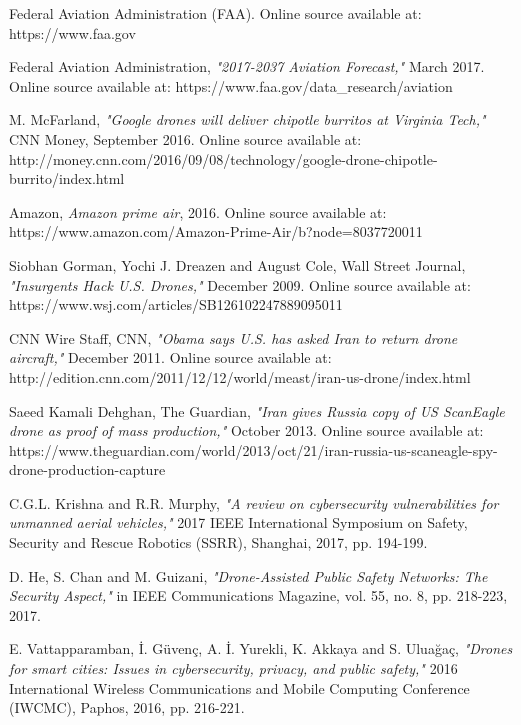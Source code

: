 \documentclass[journal]{IEEEtran}
\begin{document}
\begin{thebibliography}{1}

Federal Aviation Administration (FAA). Online source available at: https://www.faa.gov

Federal Aviation Administration, \textit{"2017-2037 Aviation Forecast,"} March 2017. Online source available at: https://www.faa.gov/data\_research/aviation

M. McFarland, \textit{"Google drones will deliver chipotle burritos at Virginia Tech,"} CNN Money, September 2016. Online source available at: http://money.cnn.com/2016/09/08/technology/google-drone-chipotle-burrito/index.html

Amazon, \textit{Amazon prime air}, 2016. Online source available at: https://www.amazon.com/Amazon-Prime-Air/b?node=8037720011

Siobhan Gorman,  Yochi J. Dreazen and August Cole, Wall Street Journal, \textit{"Insurgents Hack U.S. Drones,"} December 2009. Online source available at: https://www.wsj.com/articles/SB126102247889095011

CNN Wire Staff, CNN, \textit{"Obama says U.S. has asked Iran to return drone aircraft,"} December 2011. Online source available at: http://edition.cnn.com/2011/12/12/world/meast/iran-us-drone/index.html

Saeed Kamali Dehghan, The Guardian, \textit{"Iran gives Russia copy of US ScanEagle drone as proof of mass production,"} October 2013. Online source available at: https://www.theguardian.com/world/2013/oct/21/iran-russia-us-scaneagle-spy-drone-production-capture

C.G.L. Krishna and R.R. Murphy, \textit{"A review on cybersecurity vulnerabilities for unmanned aerial vehicles,"} 2017 IEEE International Symposium on Safety, Security and Rescue Robotics (SSRR), Shanghai, 2017, pp. 194-199.

D. He, S. Chan and M. Guizani, \textit{"Drone-Assisted Public Safety Networks: The Security Aspect,"} in IEEE Communications Magazine, vol. 55, no. 8, pp. 218-223, 2017.

E. Vattapparamban, İ. Güvenç, A. İ. Yurekli, K. Akkaya and S. Uluağaç, \textit{"Drones for smart cities: Issues in cybersecurity, privacy, and public safety,"} 2016 International Wireless Communications and Mobile Computing Conference (IWCMC), Paphos, 2016, pp. 216-221.


\end{thebibliography}
\end{document}
